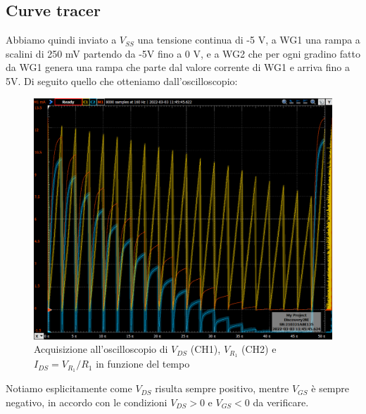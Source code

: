 \documentclass[10pt, a4paper, italian]{article}
\begin{document}
\subsection{Curve tracer}
Abbiamo quindi inviato a $V_{SS}$ una tensione continua di -5 V, a WG1 una rampa a scalini di 250 mV partendo da -5V fino a 0 V, e a WG2 che per ogni gradino fatto da WG1 genera una rampa che parte dal valore corrente di WG1 e arriva fino a 5V.
Di seguito quello che otteniamo dall'oscilloscopio:
\begin{figure}[htbp]
    \centering
	\includegraphics[scale=0.4]{time}
    \caption{Acquisizione all'oscilloscopio di $V_{DS}$ (CH1), $V_{R_1}$ (CH2)
    e $I_{DS} = V_{R_1}/R_1$ in funzione del tempo}
\end{figure}
Notiamo esplicitamente come $V_{DS}$ risulta sempre positivo, mentre $V_{GS}$
è sempre negativo, in accordo con le condizioni $V_{DS} > 0$ e $V_{GS} < 0$
da verificare.
\end{document}
